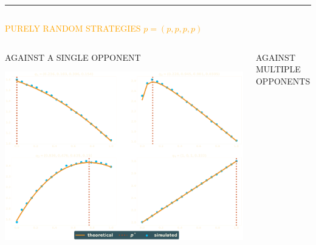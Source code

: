 \documentclass[usenames,dvipsnames,t]{beamer}
\begin{document}
\hrule height 3pt
\vspace{1cm}
\begin{columns}
    \begin{column}{.7\linewidth}
        \begin{center}
            \textcolor{orange}{\Large{PURELY RANDOM STRATEGIES \(p=(p, p, p, p)\)}}
        \end{center}

    \begin{columns}
        \begin{column}{.5\linewidth}
            \begin{center}
            \vspace{-1cm}

            \small{AGAINST A SINGLE OPPONENT}
            \vspace{2cm}

            
            \vspace{2cm}

            \includegraphics[width=.7\textwidth]{static/matches}
            \end{center}
        \end{column}
        \begin{column}{.5\linewidth}
            \begin{center}
                \vspace{-1cm}
    
                \small{AGAINST MULTIPLE OPPONENTS}
                \vspace{2cm}
    
                
                \vspace{2cm}
    

\end{center}
\end{column}
\end{columns}
\end{column}
\end{columns}
\end{document}
